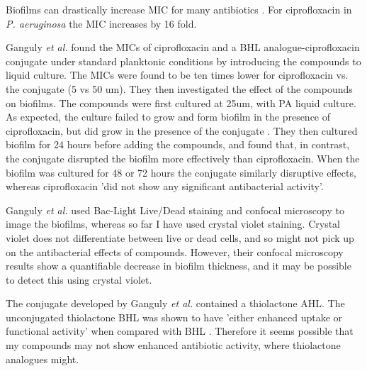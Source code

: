 %

Biofilms can drastically increase MIC for many antibiotics \cite{Ceri1999}. For ciprofloxacin in \textit{P. aeruginosa} the MIC increases by 16 fold. 

Ganguly \textit{et al.} \cite{Ganguly2011} found the MICs of ciprofloxacin and a BHL analogue-ciprofloxacin  conjugate under standard planktonic conditions by introducing the compounds to liquid culture. The MICs were found to be ten times lower for ciprofloxacin vs. the conjugate  (5 vs 50 um). They then investigated the effect of the compounds on biofilms. The compounds were first cultured at 25um, with PA liquid culture. As expected, the culture failed to grow and form biofilm in the presence of ciprofloxacin, but did grow in the presence of the conjugate . They then cultured biofilm for 24 hours before adding the compounds, and found that, in contrast, the conjugate  disrupted the biofilm more effectively than ciprofloxacin. When the biofilm was cultured for 48 or 72 hours the conjugate similarly disruptive effects, whereas ciprofloxacin 'did not show any significant antibacterial activity'.

Ganguly \textit{et al.} used Bac-Light Live/Dead staining and confocal microscopy to image the biofilms, whereas so far I have used crystal violet staining. Crystal violet does not differentiate between live or dead cells, and so might not pick up on the antibacterial effects of compounds. However, their confocal microscopy results show a quantifiable decrease in biofilm thickness, and it may be possible to detect this using crystal violet.

The conjugate  developed by Ganguly \textit{et al.} contained a thiolactone AHL. The unconjugated thiolactone BHL  was shown to have 'either enhanced uptake or functional activity' when compared with BHL . Therefore it seems possible that my compounds may not show enhanced antibiotic activity, where thiolactone analogues might.